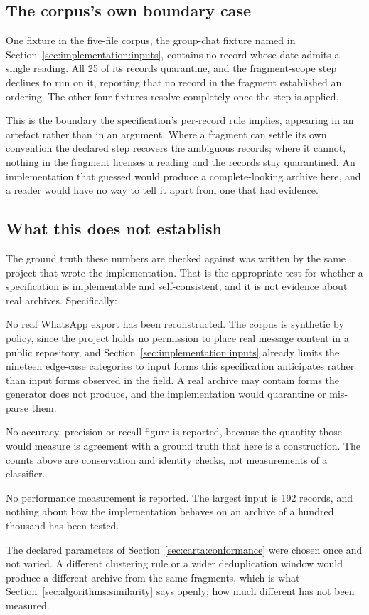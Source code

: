 \subsection{The corpus's own boundary case}
\label{sec:evaluation:boundary}

One fixture in the five-file corpus, the group-chat fixture named in
Section~\ref{sec:implementation:inputs}, contains no record whose date admits a
single reading. All 25 of its records
quarantine, and the fragment-scope step declines to run on it, reporting that no
record in the fragment established an ordering. The other four fixtures resolve
completely once the step is applied.

This is the boundary the specification's per-record rule implies, appearing in an
artefact rather than in an argument. Where a fragment can settle its own
convention the declared step recovers the ambiguous records; where it cannot,
nothing in the fragment licenses a reading and the records stay quarantined. An
implementation that guessed would produce a complete-looking archive here, and a
reader would have no way to tell it apart from one that had evidence.

\subsection{What this does not establish}
\label{sec:evaluation:limits}

The ground truth these numbers are checked against was written by the same
project that wrote the implementation. That is the appropriate test for whether a
specification is implementable and self-consistent, and it is not evidence about
real archives. Specifically:

No real WhatsApp export has been reconstructed. The corpus is synthetic by
policy, since the project holds no permission to place real message content in a
public repository, and Section~\ref{sec:implementation:inputs} already limits the
nineteen edge-case categories to input forms this specification anticipates
rather than input forms observed in the field. A real archive may contain forms
the generator does not produce, and the implementation would quarantine or
mis-parse them.

No accuracy, precision or recall figure is reported, because the quantity those
would measure is agreement with a ground truth that here is a construction. The
counts above are conservation and identity checks, not measurements of a
classifier.

No performance measurement is reported. The largest input is 192 records, and
nothing about how the implementation behaves on an archive of a hundred thousand
has been tested.

The declared parameters of Section~\ref{sec:carta:conformance} were chosen once
and not varied. A different clustering rule or a wider deduplication window would
produce a different archive from the same fragments, which is what
Section~\ref{sec:algorithms:similarity} says openly; how much different has not
been measured.

